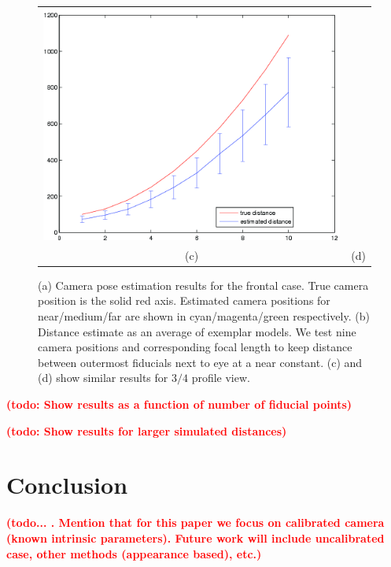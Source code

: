 \documentclass[runningheads]{llncs}
\newcommand {\afbnote} [1] {{\bf \textcolor{red}{(#1)}}}
\begin{document}
\begin{figure}[ht]
\begin{tabular}{cc}
\includegraphics[width=.45\linewidth]{resources/figures/errorbar_3q.png} \\
(c) & (d)
\end{tabular}
\caption{
(a) Camera pose estimation results for the frontal case.  
True camera position is the solid red axis.  
Estimated camera positions for near/medium/far are shown in cyan/magenta/green respectively.   
(b) Distance estimate as an average of exemplar models.  
We test nine camera positions and corresponding focal length to keep distance between outermost fiducials next to eye at a near constant. 
(c) and (d) show similar results for $3/4$ profile view.}
\label{fig:results}
\end{figure}

\afbnote{todo: Show results as a function of number of fiducial points}

\afbnote{todo: Show results for larger simulated distances}

\section{Conclusion}
\afbnote{todo... .  Mention that for this paper we focus on calibrated camera (known intrinsic parameters).  Future work will include uncalibrated case, other methods (appearance based), etc.}



\end{document}
